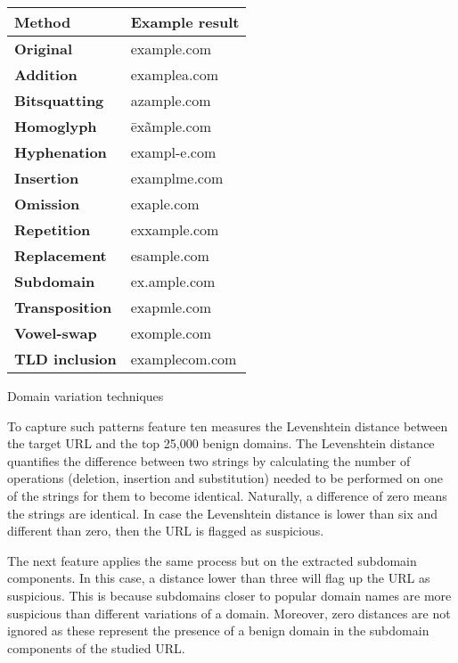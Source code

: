 \begin{singlespace}
	\begin{center}
		\label{tab:VARIATIONS}
		\begin{tabular}{ | m{13em} | m{13em} | }
			\hline
			\textbf{Method}        & \textbf{Example result} \\
			\hline
			\textbf{Original}      & example.com             \\
			\hline
			\textbf{Addition}      & examplea.com            \\
			\hline
			\textbf{Bitsquatting}  & azample.com             \\
			\hline
			\textbf{Homoglyph}     & ēxãmple.com             \\
			\hline
			\textbf{Hyphenation}   & exampl-e.com            \\
			\hline
			\textbf{Insertion}     & examplme.com            \\
			\hline
			\textbf{Omission}      & exaple.com              \\
			\hline
			\textbf{Repetition}    & exxample.com            \\
			\hline
			\textbf{Replacement}   & esample.com             \\
			\hline
			\textbf{Subdomain}     & ex.ample.com            \\
			\hline
			\textbf{Transposition} & exapmle.com             \\
			\hline
			\textbf{Vowel-swap}    & exomple.com             \\
			\hline
			\textbf{TLD inclusion} & examplecom.com          \\
			\hline
		\end{tabular}
		\captionsetup{type=table}\caption{Domain variation techniques}
	\end{center}
\end{singlespace}

To capture such patterns feature ten measures the Levenshtein distance between the target URL and the top 25,000 benign domains. The Levenshtein distance quantifies the difference between two strings by calculating the number of operations (deletion, insertion and substitution) needed to be performed on one of the strings for them to become identical. Naturally, a difference of zero means the strings are identical. In case the Levenshtein distance is lower than six and different than zero, then the URL is flagged as suspicious.

The next feature applies the same process but on the extracted subdomain components. In this case, a distance lower than three will flag up the URL as suspicious. This is because subdomains closer to popular domain names are more suspicious than different variations of a domain. Moreover, zero distances are not ignored as these represent the presence of a benign domain in the subdomain components of the studied URL.

